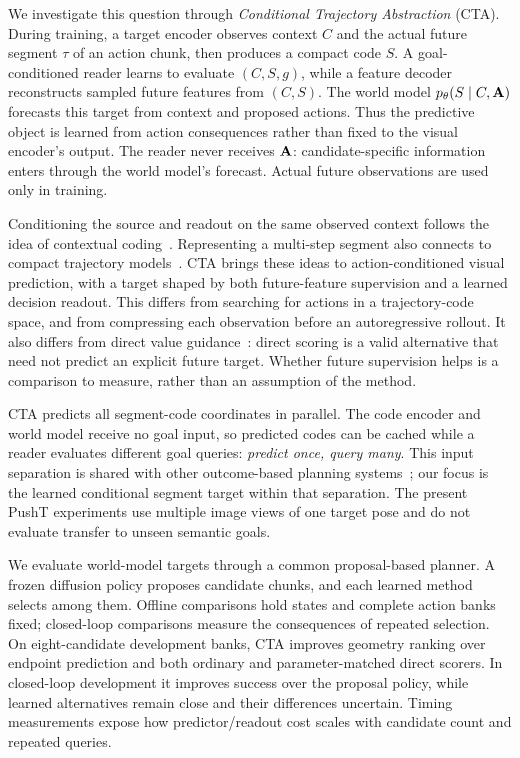 We investigate this question through \emph{Conditional Trajectory Abstraction} (CTA). During training, a target encoder observes context $C$ and the actual future segment $\tau$ of an action chunk, then produces a compact code $S$. A goal-conditioned reader learns to evaluate $(C,S,g)$, while a feature decoder reconstructs sampled future features from $(C,S)$. The world model $p_\theta(S\mid C,\mathbf{A})$ forecasts this target from context and proposed actions. Thus the predictive object is learned from action consequences rather than fixed to the visual encoder's output. The reader never receives $\mathbf{A}$: candidate-specific information enters through the world model's forecast. Actual future observations are used only in training.

Conditioning the source and readout on the same observed context follows the idea of contextual coding~\cite{li2021dcvc,micheli2024deltairis}. Representing a multi-step segment also connects to compact trajectory models~\cite{jiang2023tap}. CTA brings these ideas to action-conditioned visual prediction, with a target shaped by both future-feature supervision and a learned decision readout. This differs from searching for actions in a trajectory-code space, and from compressing each observation before an autoregressive rollout. It also differs from direct value guidance~\cite{nakamoto2024vgps}: direct scoring is a valid alternative that need not predict an explicit future target. Whether future supervision helps is a comparison to measure, rather than an assumption of the method.

CTA predicts all segment-code coordinates in parallel. The code encoder and world model receive no goal input, so predicted codes can be cached while a reader evaluates different goal queries: \emph{predict once, query many}. This input separation is shared with other outcome-based planning systems~\cite{qi2025gpc,cui2026dreamsteer}; our focus is the learned conditional segment target within that separation. The present PushT experiments use multiple image views of one target pose and do not evaluate transfer to unseen semantic goals.

We evaluate world-model targets through a common proposal-based planner. A frozen diffusion policy proposes candidate chunks, and each learned method selects among them. Offline comparisons hold states and complete action banks fixed; closed-loop comparisons measure the consequences of repeated selection. On eight-candidate development banks, CTA improves geometry ranking over endpoint prediction and both ordinary and parameter-matched direct scorers. In closed-loop development it improves success over the proposal policy, while learned alternatives remain close and their differences uncertain. Timing measurements expose how predictor/readout cost scales with candidate count and repeated queries.

